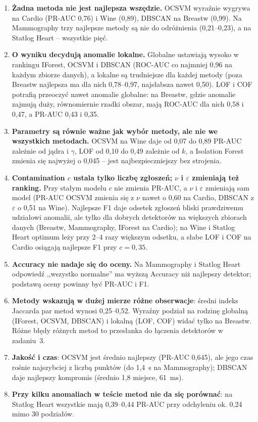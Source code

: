\documentclass[11pt,a4paper]{article}
\begin{document}
\begin{enumerate}
  \item \textbf{Żadna metoda nie jest najlepsza wszędzie.} OCSVM wyraźnie
  wygrywa na Cardio (PR-AUC 0,76) i Wine (0,89), DBSCAN na Breastw (0,99).
  Na Mammography trzy najlepsze metody są nie do odróżnienia (0,21--0,23),
  a na Statlog Heart -- wszystkie pięć.
  \item \textbf{O wyniku decydują anomalie lokalne.} Globalne ustawiają wysoko
  w rankingu IForest, OCSVM i DBSCAN (ROC-AUC co najmniej 0,96 na każdym
  zbiorze danych), a lokalne są trudniejsze dla każdej metody (poza Breastw
  najlepsza ma dla nich 0,78--0,97, najsłabsza nawet 0,50).
  LOF i COF potrafią przeoczyć nawet anomalie globalne: na Breastw, gdzie
  anomalie zajmują duży, równomiernie rzadki obszar, mają ROC-AUC dla nich
  0,58 i 0,47, a PR-AUC 0,43 i 0,35.
  \item \textbf{Parametry są równie ważne jak wybór metody, ale nie we
  wszystkich metodach.} OCSVM na Wine daje od 0,07 do 0,89 PR-AUC zależnie od
  jądra i $\gamma$, LOF od 0,10 do 0,49 zależnie od $k$, a Isolation Forest
  zmienia się najwyżej o 0,045 -- jest najbezpieczniejszy bez strojenia.
  \item \textbf{Contamination $c$ ustala tylko liczbę zgłoszeń; $\nu$
  i $\varepsilon$ zmieniają też ranking.} Przy stałym modelu $c$ nie zmienia
  PR-AUC, a $\nu$ i $\varepsilon$ zmieniają sam model (PR-AUC OCSVM zmienia się
  z $\nu$ nawet o 0,60 na Cardio, DBSCAN z $\varepsilon$ o 0,51 na Wine).
  Najlepsze F1 daje odsetek zgłoszeń bliski prawdziwemu udziałowi anomalii, ale
  tylko dla dobrych detektorów na większych zbiorach danych (Breastw,
  Mammography, IForest na Cardio); na Wine i Statlog Heart optimum leży przy
  2--4 razy większym odsetku, a słabe LOF i COF na Cardio osiągają najlepsze F1
  przy $c=0{,}35$.
  \item \textbf{Accuracy nie nadaje się do oceny.} Na Mammography i Statlog
  Heart odpowiedź ,,wszystko normalne'' ma wyższą Accuracy niż najlepszy
  detektor; podstawą oceny powinny być PR-AUC i F1.
  \item \textbf{Metody wskazują w dużej mierze różne obserwacje}: średni indeks
  Jaccarda par metod wynosi 0,25--0,52. Wyraźny podział na rodzinę globalną
  (IForest, OCSVM, DBSCAN) i lokalną (LOF, COF) widać tylko na Breastw. Różne
  błędy różnych metod to przesłanka do łączenia detektorów w zadaniu~3.
  \item \textbf{Jakość i czas}: OCSVM jest średnio najlepszy (PR-AUC 0,645),
  ale jego czas rośnie najszybciej z liczbą punktów (do 1,4~s na
  Mammography); DBSCAN daje najlepszy kompromis (średnio 1,8 miejsce,
  61~ms).
  \item \textbf{Przy kilku anomaliach w teście metod nie da się porównać}:
  na Statlog Heart wszystkie mają 0,39--0,44 PR-AUC przy odchyleniu ok. 0,24
  mimo 30 podziałów.
\end{enumerate}
\end{document}
